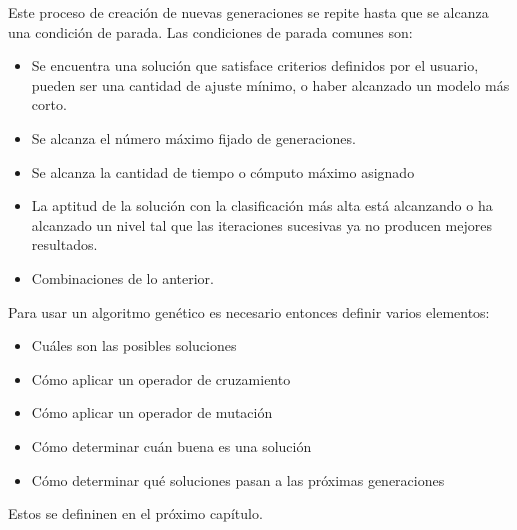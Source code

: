 Este proceso de creación de nuevas generaciones se repite hasta que se alcanza una condición de parada. Las condiciones de parada comunes son:

\begin{itemize}
    \item Se encuentra una solución que satisface criterios definidos por el usuario, pueden ser una cantidad de ajuste mínimo, o haber alcanzado un modelo más corto.
    \item Se alcanza el número máximo fijado de generaciones.
    \item Se alcanza la cantidad de tiempo o cómputo máximo asignado
    \item La aptitud de la solución con la clasificación más alta está alcanzando o ha alcanzado un nivel tal que las iteraciones sucesivas ya no producen mejores resultados.
    \item Combinaciones de lo anterior.
\end{itemize}

Para usar un algoritmo genético es necesario entonces definir varios elementos:

\begin{itemize}
    \item Cuáles son las posibles soluciones
    \item Cómo aplicar un operador de cruzamiento
    \item Cómo aplicar un operador de mutación
    \item Cómo determinar cuán buena es una solución
    \item Cómo determinar qué soluciones pasan a las próximas generaciones
\end{itemize}

Estos se defininen en el próximo capítulo.
